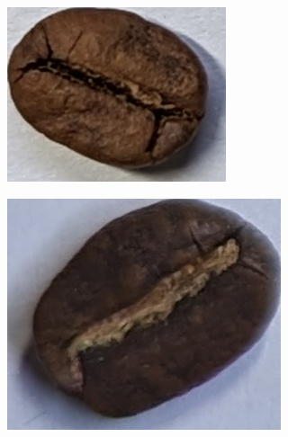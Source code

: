 \begin{figure}[h]
    \begin{subfigure}
    {0.2\textwidth}
        \includegraphics[height=0.8\linewidth, keepaspectratio]{
            ./figures/methodology/quaker-bean
        }
         \label{fig:quakerBeanSingle}
    \end{subfigure}
    \begin{subfigure}
    {0.2\textwidth}
        \includegraphics[height=0.8\linewidth, keepaspectratio]{
            ./figures/methodology/normal-bean
        }
         \label{fig:normalBeanSingle}

\end{subfigure}
\end{figure}
